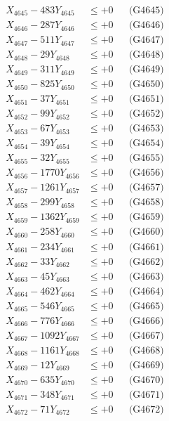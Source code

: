 \documentclass[a4paper,10pt]{article}
\begin{document}
{\begin{align}
X_{4645} - 483Y_{4645} &\leq +0 && \text{(G4645)} \\
X_{4646} - 287Y_{4646} &\leq +0 && \text{(G4646)} \\
X_{4647} - 511Y_{4647} &\leq +0 && \text{(G4647)} \\
X_{4648} - 29Y_{4648} &\leq +0 && \text{(G4648)} \\
X_{4649} - 311Y_{4649} &\leq +0 && \text{(G4649)} \\
X_{4650} - 825Y_{4650} &\leq +0 && \text{(G4650)} \\
\allowbreak
X_{4651} - 37Y_{4651} &\leq +0 && \text{(G4651)} \\
X_{4652} - 99Y_{4652} &\leq +0 && \text{(G4652)} \\
X_{4653} - 67Y_{4653} &\leq +0 && \text{(G4653)} \\
X_{4654} - 39Y_{4654} &\leq +0 && \text{(G4654)} \\
X_{4655} - 32Y_{4655} &\leq +0 && \text{(G4655)} \\
X_{4656} - 1770Y_{4656} &\leq +0 && \text{(G4656)} \\
X_{4657} - 1261Y_{4657} &\leq +0 && \text{(G4657)} \\
X_{4658} - 299Y_{4658} &\leq +0 && \text{(G4658)} \\
X_{4659} - 1362Y_{4659} &\leq +0 && \text{(G4659)} \\
X_{4660} - 258Y_{4660} &\leq +0 && \text{(G4660)} \\
\allowbreak
X_{4661} - 234Y_{4661} &\leq +0 && \text{(G4661)} \\
X_{4662} - 33Y_{4662} &\leq +0 && \text{(G4662)} \\
X_{4663} - 45Y_{4663} &\leq +0 && \text{(G4663)} \\
X_{4664} - 462Y_{4664} &\leq +0 && \text{(G4664)} \\
X_{4665} - 546Y_{4665} &\leq +0 && \text{(G4665)} \\
X_{4666} - 776Y_{4666} &\leq +0 && \text{(G4666)} \\
X_{4667} - 1092Y_{4667} &\leq +0 && \text{(G4667)} \\
X_{4668} - 1161Y_{4668} &\leq +0 && \text{(G4668)} \\
X_{4669} - 12Y_{4669} &\leq +0 && \text{(G4669)} \\
X_{4670} - 635Y_{4670} &\leq +0 && \text{(G4670)} \\
\allowbreak
X_{4671} - 348Y_{4671} &\leq +0 && \text{(G4671)} \\
X_{4672} - 71Y_{4672} &\leq +0 && \text{(G4672)} \\

\end{align}}
\end{document}
